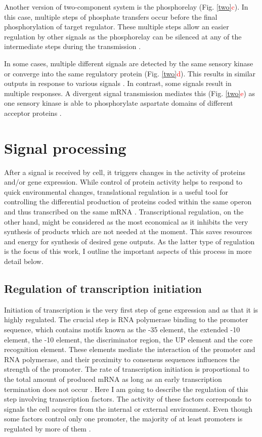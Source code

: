 Another version of two-component system is the phosphorelay (Fig. \ref{two}\textcolor{red}{c}).
In this case, multiple steps of phosphate transfers occur before the final phosphorylation of target regulator.
These multiple steps allow an easier regulation by other signals as the phosphorelay can be silenced at any of the intermediate steps during the transmission \cite{perego2001pentapeptide, groisman2016feedback}.

In some cases, multiple different signals are detected by the same sensory kinase or converge into the same regulatory protein (Fig. \ref{two}\textcolor{red}{d}).
This results in similar outputs in response to various signals \cite{kaczmarczyk2014complex, chambonnier2016hybrid}.
In contrast, some signals result in multiple responses.
A divergent signal transmission mediates this (Fig. \ref{two}\textcolor{red}{e}) as one sensory kinase is able to phosphorylate aspartate domains of different acceptor proteins \cite{mika2005two, groisman2016feedback}.

\section{Signal processing}
After a signal is received by cell, it triggers changes in the activity of proteins and/or gene expression.
While control of protein activity helps to respond to quick environmental changes, translational regulation is a useful tool for controlling the differential production of proteins coded within the same operon and thus transcribed on the same mRNA \cite{dar2018extensive}.
Transcriptional regulation, on the other hand, might be considered as the most economical as it inhibits the very synthesis of products which are not needed at the moment.
This saves resources and energy for synthesis of desired gene outputs.
As the latter type of regulation is the focus of this work, I outline the important aspects of this process in more detail below.

\subsection{Regulation of transcription initiation}
Initiation of transcription is the very first step of gene expression and as that it is highly regulated.
The crucial step is RNA polymerase binding to the promoter sequence, which contains motifs known as the -35 element, the extended -10 element, the -10 element, the
discriminator region, the UP element and the core recognition element.
These elements mediate the interaction of the promoter and RNA polymerase, and their proximity to consensus sequences influences the strength of the promoter.
The rate of transcription initiation is proportional to the total amount of produced mRNA as long as an early transcription termination does not occur \cite{kennell1977transcription, iyer1996absolute}.
Here I am going to describe the regulation of this step involving transcription factors.
The activity of these factors corresponds to signals the cell acquires from the internal or external environment.
Even though some factors control only one promoter, the majority of at least  promoters is regulated by more of them \cite{karp2014ecocyc}.

